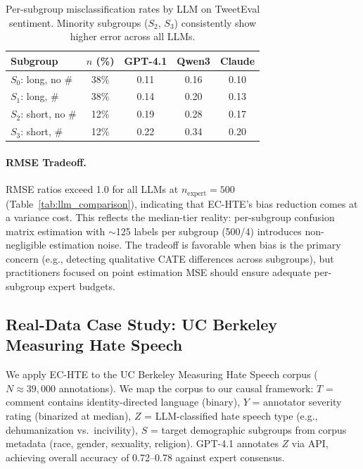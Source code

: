 \documentclass[11pt,a4paper]{article}
\begin{document}
\begin{table}[t]
\centering
\small
\begin{tabular}{lcccc}
\toprule
\textbf{Subgroup} & $n$ \textbf{(\%)} & \textbf{GPT-4.1} & \textbf{Qwen3} & \textbf{Claude} \\
\midrule
$S_0$: long, no \# & 38\% & 0.11 & 0.16 & 0.10 \\
$S_1$: long, \# & 38\% & 0.14 & 0.20 & 0.13 \\
$S_2$: short, no \# & 12\% & 0.19 & 0.28 & 0.17 \\
$S_3$: short, \# & 12\% & 0.22 & 0.34 & 0.20 \\
\bottomrule
\end{tabular}
\caption{Per-subgroup misclassification rates by LLM on TweetEval sentiment. Minority subgroups ($S_2$, $S_3$) consistently show higher error across all LLMs.}
\label{tab:per_subgroup_misclass}
\end{table}

\paragraph{RMSE Tradeoff.}
RMSE ratios exceed 1.0 for all LLMs at $n_{\text{expert}}=500$ (Table~\ref{tab:llm_comparison}), indicating that EC-HTE's bias reduction comes at a variance cost.
This reflects the median-tier reality: per-subgroup confusion matrix estimation with $\sim$125 labels per subgroup (500/4) introduces non-negligible estimation noise.
The tradeoff is favorable when bias is the primary concern (e.g., detecting qualitative CATE differences across subgroups), but practitioners focused on point estimation MSE should ensure adequate per-subgroup expert budgets.

\subsection{Real-Data Case Study: UC Berkeley Measuring Hate Speech}\label{sec:hate_speech}

We apply EC-HTE to the UC Berkeley Measuring Hate Speech corpus \citep{kennedy2020} ($N \approx 39{,}000$ annotations).
We map the corpus to our causal framework: $T$ = comment contains identity-directed language (binary), $Y$ = annotator severity rating (binarized at median), $Z$ = LLM-classified hate speech type (e.g., dehumanization vs.\ incivility), $S$ = target demographic subgroups from corpus metadata (race, gender, sexuality, religion).
GPT-4.1 annotates $Z$ via API, achieving overall accuracy of 0.72--0.78 against expert consensus.
\end{document}
